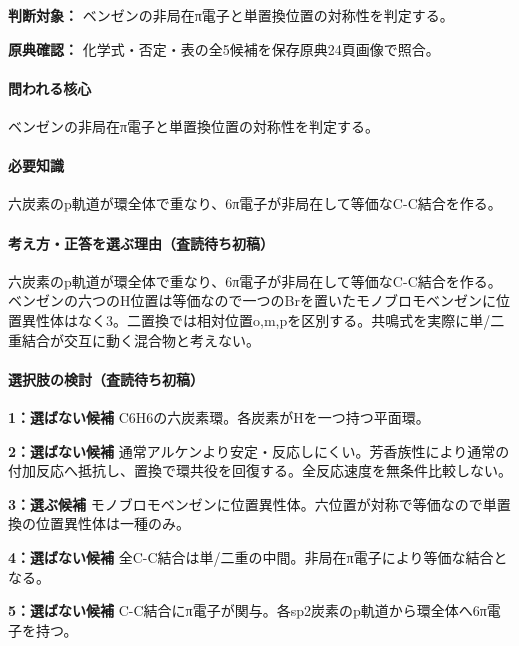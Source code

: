 \noindent\textbf{判断対象：} ベンゼンの非局在π電子と単置換位置の対称性を判定する。\par

\noindent\textbf{原典確認：} 化学式・否定・表の全5候補を保存原典24頁画像で照合。\par

\paragraph{問われる核心} ベンゼンの非局在π電子と単置換位置の対称性を判定する。

\paragraph{必要知識} 六炭素のp軌道が環全体で重なり、6π電子が非局在して等価なC-C結合を作る。

\paragraph{考え方・正答を選ぶ理由（査読待ち初稿）} 六炭素のp軌道が環全体で重なり、6π電子が非局在して等価なC-C結合を作る。ベンゼンの六つのH位置は等価なので一つのBrを置いたモノブロモベンゼンに位置異性体はなく3。二置換では相対位置o,m,pを区別する。共鳴式を実際に単/二重結合が交互に動く混合物と考えない。

\paragraph{選択肢の検討（査読待ち初稿）}\mbox{}\par

\noindent\textbf{1：選ばない候補} C6H6の六炭素環。各炭素がHを一つ持つ平面環。\par

\noindent\textbf{2：選ばない候補} 通常アルケンより安定・反応しにくい。芳香族性により通常の付加反応へ抵抗し、置換で環共役を回復する。全反応速度を無条件比較しない。\par

\noindent\textbf{3：選ぶ候補} モノブロモベンゼンに位置異性体。六位置が対称で等価なので単置換の位置異性体は一種のみ。\par

\noindent\textbf{4：選ばない候補} 全C-C結合は単/二重の中間。非局在π電子により等価な結合となる。\par

\noindent\textbf{5：選ばない候補} C-C結合にπ電子が関与。各sp2炭素のp軌道から環全体へ6π電子を持つ。\par

